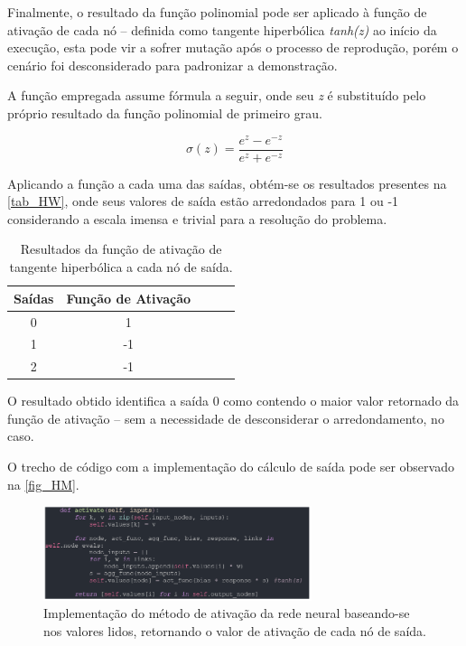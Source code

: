 Finalmente, o resultado da função polinomial pode ser aplicado à função de ativação de cada nó – definida como tangente hiperbólica \textit{tanh(z)} ao início da execução, esta pode vir a sofrer mutação após o processo de reprodução, porém o cenário foi desconsiderado para padronizar a demonstração.

A função empregada assume fórmula a seguir, onde seu \textit{z} é substituído pelo próprio resultado da função polinomial de primeiro grau.

\[ \sigma(z) = \frac{e^z - e^{-z}}{e^z + e^{-z}}\]

Aplicando a função a cada uma das saídas, obtém-se os resultados presentes na \autoref{tab_HW}, onde seus valores de saída estão arredondados para 1 ou -1 considerando a escala imensa e trivial para a resolução do problema.

\begin{table}[htb]
	\centering
    \caption{\label{tab_HW}Resultados da função de ativação de tangente hiperbólica a cada nó de saída.}
    \begin{tabular}{ccccc}
        \hline
		\textbf{Sa\'{i}das} & \textbf{Fun\c{c}\~{a}o de Ativa\c{c}\~{a}o} \\ \hline
		0 & 1    \\ \hline
		1 & -1    \\ \hline
		2 & -1  \\ \hline
    \end{tabular}
    
\end{table}

O resultado obtido identifica a saída 0 como contendo o maior valor retornado da função de ativação – sem a necessidade de desconsiderar o arredondamento, no caso.

O trecho de código com a implementação do cálculo de saída pode ser observado na \autoref{fig_HM}.

\begin{figure}[htb]
        \centering
        \caption{\label{fig_HM}Implementação do método de ativação da rede neural baseando-se nos valores lidos, retornando o valor de ativação de cada nó de saída.}
        \includegraphics[width=0.7\textwidth]{images/HM.png}
\end{figure}

